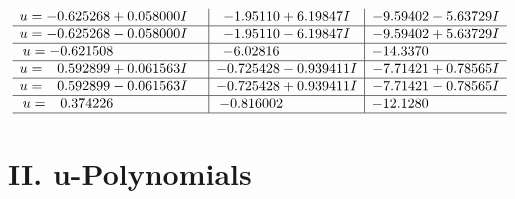\documentclass[1p]{elsarticle_modified}
\theoremstyle{definition}
\begin{document}
$$\begin{array}{c|c|c}
\begin{aligned}
u &= -0.625268 + 0.058000 I\end{aligned}
 & -1.95110 + 6.19847 I & -9.59402 - 5.63729 I \\ \hline\begin{aligned}
u &= -0.625268 - 0.058000 I\end{aligned}
 & -1.95110 - 6.19847 I & -9.59402 + 5.63729 I \\ \hline\begin{aligned}
u &= -0.621508\phantom{ +0.000000I}\end{aligned}
 & -6.02816\phantom{ +0.000000I} & -14.3370\phantom{ +0.000000I} \\ \hline\begin{aligned}
u &= \phantom{-}0.592899 + 0.061563 I\end{aligned}
 & -0.725428 - 0.939411 I & -7.71421 + 0.78565 I \\ \hline\begin{aligned}
u &= \phantom{-}0.592899 - 0.061563 I\end{aligned}
 & -0.725428 + 0.939411 I & -7.71421 - 0.78565 I \\ \hline\begin{aligned}
u &= \phantom{-}0.374226\phantom{ +0.000000I}\end{aligned}
 & -0.816002\phantom{ +0.000000I} & -12.1280\phantom{ +0.000000I}\\
 \hline 
 \end{array}$$\newpage
\newpage\renewcommand{\arraystretch}{1}
\centering \section*{ II. u-Polynomials}
\end{document}
